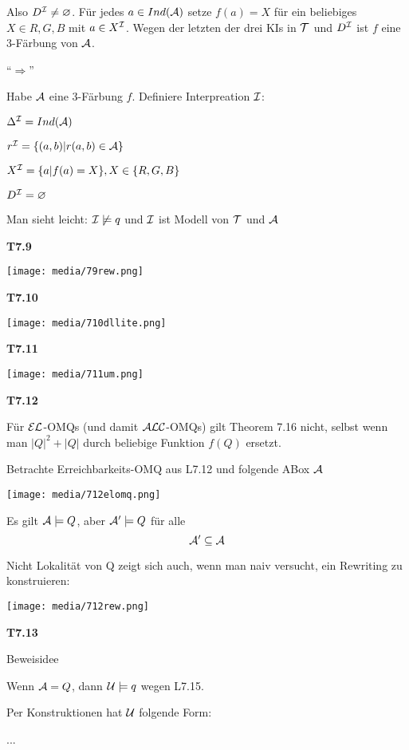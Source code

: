 Also $D^{\mathcal{I}} \neq \varnothing$. Für jedes $a \in Ind(\mathcal{A})$ setze $f(a) = X$ für ein beliebiges $X \in{R,G,B}$ mit $a \in X^{\mathcal{I}}$. Wegen der letzten der drei KIs in $\mathcal{T}$ und $D^{\mathcal{I}}$ ist $f$ eine 3-Färbung von $\mathcal{A}$.

"`$\Rightarrow$"'

Habe $\mathcal{A}$ eine 3-Färbung $f$. Definiere Interpreation $\mathcal{I}$:

$\Delta^{\mathcal{I}} = Ind(\mathcal{A})$

$r^{\mathcal{I}} = \{(a,b) | r(a,b) \in \mathcal{A} \}$

$X^{\mathcal{I}} = \{a | f(a) = X\}, X \in \{R,G,B\}$

$D^{\mathcal{I}} = \varnothing$

Man sieht leicht: $\mathcal{I} \not\models q$ und $\mathcal{I}$ ist Modell von $\mathcal{T}$ und $\mathcal{A}$

\textbf{T7.9}

\texttt{[image: media/79rew.png]}

\textbf{T7.10}

\texttt{[image: media/710dllite.png]}

\textbf{T7.11}

\texttt{[image: media/711um.png]}

\textbf{T7.12}

Für $\mathcal{E}\mathcal{L}$-OMQs (und damit $\mathcal{A}\mathcal{L}\mathcal{C}$-OMQs) gilt Theorem 7.16 nicht, selbst wenn man $|Q|^2 + |Q|$ durch beliebige Funktion $f(Q)$ ersetzt. 

Betrachte Erreichbarkeits-OMQ aus L7.12 und folgende ABox $\mathcal{A}$

\texttt{[image: media/712elomq.png]}

Es gilt $\mathcal{A} \models Q$, aber $\mathcal{A}' \models Q$ für alle $$\mathcal{A}' \subseteq \mathcal{A}$$

Nicht Lokalität von Q zeigt sich auch, wenn man naiv versucht, ein Rewriting zu konstruieren:

\texttt{[image: media/712rew.png]}

\textbf{T7.13}

Beweisidee

Wenn $\mathcal{A} = Q$, dann $\mathcal{U} \models q$ wegen L7.15.

Per Konstruktionen hat $\mathcal{U}$ folgende Form:

...
